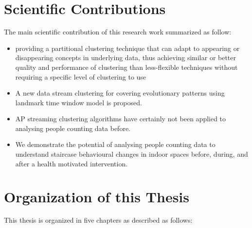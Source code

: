  






\section{Scientific Contributions}


The main scientific contribution of this research work summarized as follow:

\begin{itemize}
    \item  providing a partitional clustering technique that can adapt to appearing or disappearing concepts in underlying data, thus achieving similar or better quality and performance of clustering than less-flexible techniques without requiring a specific level of clustering to use
    
    \item A new data stream clustering for covering evolutionary patterns using landmark time window model is proposed. 
    \item AP streaming clustering algorithms have certainly not been applied to analysing people counting data before.
    
    \item We demonstrate the potential of analysing people counting data to understand staircase behavioural changes in indoor spaces before, during, and after a health motivated intervention.
\end{itemize}




\section{Organization of this Thesis}
This thesis is organized in five chapters as described as follows:

